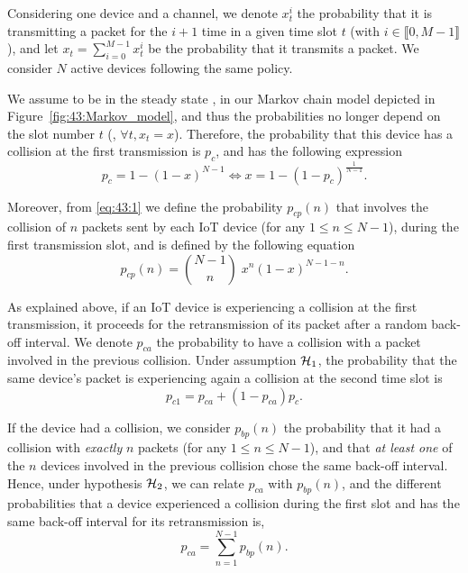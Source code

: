Considering one device and a channel,
we denote $x_t^i$ the probability that it is transmitting a packet for the $i+1$ time in a given time slot $t$ (with $i\in \llbracket 0, M-1 \rrbracket$),
and let $x_t = \sum_{i=0}^{M-1}x_t^i$ be the probability that it transmits a packet.
We consider $N$ active devices following the same policy.

We assume to be in the steady state \cite{Norris98}, in our Markov chain model depicted in Figure~\ref{fig:43:Markov_model}, and thus the probabilities no longer depend on the slot number $t$ (\ie, $\forall t, x_t=x$).
Therefore, the probability that this device has a collision at the first transmission is $p_c$, and has the following expression
\begin{equation}\label{eq:43:1}
	p_c = 1-\left(1-x\right)^{N-1} \iff x = 1-\left(1-p_c\right)^{\frac{1}{N-1}}.
\end{equation}

Moreover, from \eqref{eq:43:1} we define the probability $p_{cp}(n)$ that involves the collision of $n$ packets sent by each IoT device (for any $1\leq n \leq N-1$), during the first transmission slot, and is defined by the following equation
\begin{equation*}\label{eq:43:2}
	p_{cp}(n) = {N-1 \choose n} \; x^n \left(1-x\right)^{N-1-n}.
\end{equation*}

As explained above, if an IoT device is experiencing a collision at the first transmission, it proceeds for the retransmission of its packet after a random back-off interval.
We denote $p_{ca}$ the probability to have a collision with a packet involved in the previous collision.
Under assumption $\mathcal{H}_{1}$, the probability that the same device's packet is experiencing again a collision at the second time slot is
\begin{equation}\label{eq:43:decomppc1}
	p_{c1} = p_{ca}+\left(1-p_{ca} \right)p_c.
\end{equation}

If the device had a collision, we consider $p_{bp}(n)$ the probability that it had a collision with \emph{exactly} $n$ packets (for any $1\leq n \leq N-1$), and that \emph{at least one} of the $n$ devices involved in the previous collision chose the same back-off interval.
Hence, under hypothesis $\mathcal{H}_{2}$, we can relate $p_{ca}$ with $p_{bp}(n)$, and the different probabilities that a device experienced a collision during the first slot and has the same back-off interval for its retransmission is,
%
\begin{equation}\label{eq:43:sumpca}
	p_{ca} = \sum_{n=1}^{N-1} p_{bp}(n).
\end{equation}

